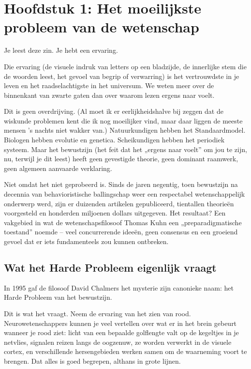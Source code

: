 \documentclass[11pt, twoside, openright]{book}
\begin{document}
\mainmatter
\pagestyle{fancy}
\chapter*{Hoofdstuk 1: Het moeilijkste probleem van de wetenschap}

Je leest deze zin. Je hebt een ervaring.

Die ervaring (de visuele indruk van letters op een bladzijde, de innerlijke stem die de woorden leest, het gevoel van begrip of verwarring) is het vertrouwdste in je leven en het raadselachtigste in het universum. We weten meer over de binnenkant van zwarte gaten dan over waarom lezen ergens naar voelt.

Dit is geen overdrijving. (Al moet ik er eerlijkheidshalve bij zeggen dat de wiskunde problemen kent die ik nog moeilijker vind, maar daar liggen de meeste mensen ’s nachts niet wakker van.) Natuurkundigen hebben het Standaardmodel. Biologen hebben evolutie en genetica. Scheikundigen hebben het periodiek systeem. Maar het bewustzijn (het feit dat het „ergens naar voelt” om jou te zijn, nu, terwijl je dit leest) heeft geen gevestigde theorie, geen dominant raamwerk, geen algemeen aanvaarde verklaring.

Niet omdat het niet geprobeerd is. Sinds de jaren negentig, toen bewustzijn na decennia van behavioristische ballingschap weer een respectabel wetenschappelijk onderwerp werd, zijn er duizenden artikelen gepubliceerd, tientallen theorieën voorgesteld en honderden miljoenen dollars uitgegeven. Het resultaat? Een vakgebied in wat de wetenschapsfilosoof Thomas Kuhn een „preparadigmatische toestand” noemde -- veel concurrerende ideeën, geen consensus en een groeiend gevoel dat er iets fundamenteels zou kunnen ontbreken.

\section*{Wat het Harde Probleem eigenlijk vraagt}

In 1995 gaf de filosoof David Chalmers het mysterie zijn canonieke naam: het Harde Probleem van het bewustzijn.

Dit is wat het vraagt. Neem de ervaring van het zien van rood. Neurowetenschappers kunnen je veel vertellen over wat er in het brein gebeurt wanneer je rood ziet: licht van een bepaalde golflengte valt op de kegeltjes in je netvlies, signalen reizen langs de oogzenuw, ze worden verwerkt in de visuele cortex, en verschillende hersengebieden werken samen om de waarneming voort te brengen. Dat alles is goed begrepen, althans in grote lijnen.
\end{document}
